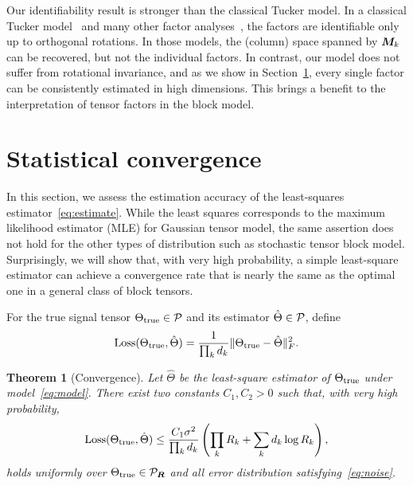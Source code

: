 \documentclass{article}
\newtheorem{theorem}{Theorem}
\begin{document}
Our identifiability result is stronger than the classical Tucker model. In a classical Tucker model~\cite{zhang2018tensor,kolda2009tensor} and many other factor analyses~\cite{darton1980rotation,abdi2003factor}, the factors are identifiable only up to orthogonal rotations. In those models, the (column) space spanned by $\bm M_k$ can be recovered, but not the individual factors. In contrast, our model does not suffer from rotational invariance, and as we show in Section~\ref{sec:theory}, every single factor can be consistently estimated in high dimensions. This brings a benefit to the interpretation of tensor factors in the block model.  



\section{Statistical convergence}\label{sec:theory}
In this section, we assess the estimation accuracy of the least-squares estimator~\eqref{eq:estimate}. While the least squares corresponds to the maximum likelihood estimator (MLE) for Gaussian tensor model, the same assertion does not hold for the other types of distribution such as stochastic tensor block model. Surprisingly, we will show that, with very high probability, a simple least-square estimator can achieve a convergence rate that is nearly the same as the optimal one in a general class of block tensors. 

For the true signal tensor $\Theta_{\text{true}}\in\mathcal{P}$ and its estimator $\hat \Theta\in\mathcal{P}$, define
\[
\text{Loss}(\Theta_{\text{true}},\hat \Theta)={1\over \prod_k d_k}\lVert\Theta_{\text{true}}-\hat \Theta\rVert_F^2. 
\]

\begin{theorem}[Convergence] \label{thm:main}
Let $\hat \Theta$ be the least-square estimator of $\Theta_{\text{true}}$ under model~\eqref{eq:model}. There exist two constants $C_1, C_2>0$ such that, with very high probability,  
\begin{equation}\label{eq:bound}
\text{Loss}(\Theta_{\text{true}},\hat \Theta)\leq {C_1 \sigma^2\over  \prod_k d_k} \left(\prod_k R_k+\sum_k d_k \log R_k\right),
\end{equation}
holds uniformly over $\Theta_{\text{true}}\in\mathcal{P}_{\bm{R}}$ and all error distribution satisfying~\eqref{eq:noise}. 
\end{theorem}
\end{document}
